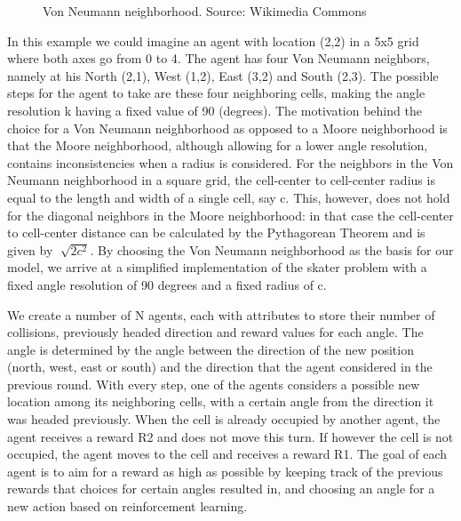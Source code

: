 \documentclass[a4paper]{article}
\begin{document}
\begin{figure}[h]
\caption{Von Neumann neighborhood. Source: Wikimedia Commons}
\end{figure}
In this example we could imagine an agent with location (2,2) in a 5x5 grid where both axes go from 0 to 4. The agent has four Von Neumann neighbors, namely at his North (2,1), West (1,2), East (3,2) and South (2,3). The possible steps for the agent to take are these four neighboring cells, making the angle resolution k having a fixed value of 90 (degrees). The motivation behind the choice for a Von Neumann neighborhood as opposed to a Moore neighborhood is that the Moore neighborhood, although allowing for a lower angle resolution, contains inconsistencies when a radius is considered. For the neighbors in the Von Neumann neighborhood in a square grid, the cell-center to cell-center radius is equal to the length and width of a single cell, say c.  This, however, does not hold for the diagonal neighbors in the Moore neighborhood: in that case the cell-center to cell-center distance can be calculated by the Pythagorean Theorem and is given by $\sqrt[]{2c^2}$. By choosing the Von Neumann neighborhood as the basis for our model, we arrive at a simplified implementation of the skater problem with a fixed angle resolution of 90 degrees and a fixed radius of c.
\newline

We create a number of N agents, each with attributes to store their number of collisions, previously headed direction and reward values for each angle. The angle is determined by the angle between the direction of the new position (north, west, east or south) and the direction that the agent considered in the previous round. With every step, one of the agents considers a possible new location among its neighboring cells, with a certain angle from the direction it was headed previously. When the cell is already occupied by another agent, the agent receives a reward R2 and does not move this turn. If however the cell is not occupied, the agent moves to the cell and receives a reward R1. The goal of each agent is to aim for a reward as high as possible by keeping track of the previous rewards that choices for certain angles resulted in, and choosing an angle for a new action based on reinforcement learning. 
\end{document}

